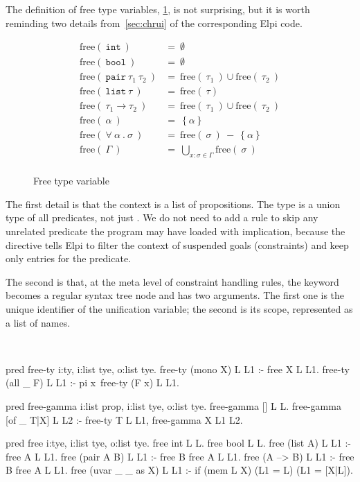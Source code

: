 \documentclass[a4paper, 11pt]{book}
\newenvironment{elpicode}
  {\VerbatimEnvironment~\\\begin{elpibox}\begin{xelpicode}}{\end{xelpicode}
\end{elpibox}\\}
\begin{document}
The definition of free type variables, \cref{img:free}, is not surprising,
but it is worth reminding two details 
from~\cref{sec:chrui} of the corresponding Elpi code.

\begin{figure}
$$
\begin{array}{ll}
  \text{free}(\ \mathtt{int}\ ) &=\ \emptyset\\
  \text{free}(\ \mathtt{bool}\ ) &=\ \emptyset\\
  \text{free}(\ \mathtt{pair}\ \tau_1\ \tau_2\ ) &=\ \text{free}(\ \tau_1\ )\cup \text{free}(\ \tau_2\ ) \\
  \text{free}(\ \mathtt{list}\ \tau\ ) &=\ \text{free}(\ \tau ) \\
  \text{free}(\ \tau_1 \to \tau_2\ ) &=\ \text{free}(\ \tau_1\ )\cup \text{free}(\ \tau_2\ ) \\
  \text{free}(\ \alpha\ ) &=\ \left\{\alpha\right\}\\
  \text{free}(\ \forall\ \alpha\ .\ \sigma\ ) &=\ \text{free}(\ \sigma\ )\  -\  \left\{\alpha\right\}\\
  \text{free}(\ \Gamma\ ) &=\ \bigcup\limits_{x:\sigma \in \Gamma}\text{free}(\ \sigma\ )\\
\end{array}
$$
\caption{Free type variable\label{img:free}}
\end{figure}


The first detail is that the context is a list of propositions. The
 type is a union type of all predicates, not just .
We do not need to add a rule to skip any unrelated predicate
the program may have loaded with implication, because the  directive tells Elpi to filter the context of suspended goals
(constraints) and keep only entries for the  predicate.

The second is that, at the meta level of constraint handling rules, the
 keyword becomes a regular syntax tree node and has two arguments.
The first one is the unique identifier of the unification variable; the second is
its scope, represented as a list of names.

\begin{elpicode}
pred free-ty i:ty, i:list tye, o:list tye.
free-ty (mono X) L L1 :- free X L L1.
free-ty (all _ F) L L1 :- pi x\ free-ty (F x) L L1.

pred free-gamma i:list prop, i:list tye, o:list tye.
free-gamma [] L L.
free-gamma [of _ T|X] L L2 :- free-ty T L L1, free-gamma X L1 L2.

pred free i:tye, i:list tye, o:list tye.
free int L L.
free bool L L.
free (list A) L L1 :- free A L L1.
free (pair A B) L L1 :- free B {free A L} L1.
free (A --> B) L L1 :- free B {free A L} L1.
free (uvar _ _ as X) L L1 :- if (mem L X) (L1 = L) (L1 = [X|L]).
\end{elpicode}
\end{document}
